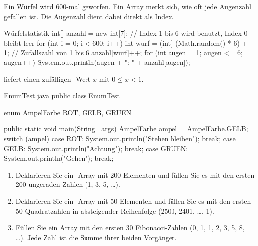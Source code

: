 Ein Würfel wird 600-mal geworfen. Ein Array merkt sich, wie oft jede Augenzahl gefallen ist. Die Augenzahl dient dabei direkt als Index.
\begin{javacode}[Ausschnitt]{Würfelstatistik}
int[] anzahl = new int[7];                  // Index 1 bis 6 wird benutzt, Index 0 bleibt leer
for (int i = 0; i < 600; i++) {
	int wurf = (int) (Math.random() * 6) + 1;   // Zufallszahl von 1 bis 6
	anzahl[wurf]++;
}
for (int augen = 1; augen <= 6; augen++) {
	System.out.println(augen + ": " + anzahl[augen]);
}
\end{javacode}
 liefert einen zufälligen -Wert $x$ mit $0 \leq x < 1$.

\begin{javacode}{EnumTest.java}
public class EnumTest {
	enum AmpelFarbe { ROT, GELB, GRUEN }

	public static void main(String[] args) {
		AmpelFarbe ampel = AmpelFarbe.GELB;
		switch (ampel) {
			case ROT:   System.out.println("Stehen bleiben"); break;
			case GELB:  System.out.println("Achtung"); break;
			case GRUEN: System.out.println("Gehen"); break;
		}
	}
}
\end{javacode}

\aufgaben
{}
\begin{enumerate}[label=\alph*)]
\item Deklarieren Sie ein -Array mit 200 Elementen und füllen Sie es mit den ersten 200 ungeraden Zahlen (1, 3, 5, \ldots).
\item Deklarieren Sie ein -Array mit 50 Elementen und füllen Sie es mit den ersten 50 Quadratzahlen in absteigender Reihenfolge (2500, 2401, \ldots, 1).
\item Füllen Sie ein Array mit den ersten 30 Fibonacci-Zahlen (0, 1, 1, 2, 3, 5, 8, \ldots). Jede Zahl ist die Summe ihrer beiden Vorgänger.
\end{enumerate}

